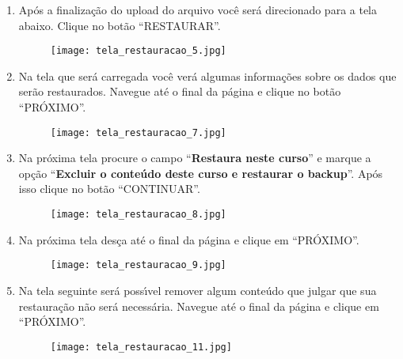 \documentclass[12pt]{report}
\begin{document}
\begin{enumerate}[\bf 1)]
  	\newpage

	\item Ap\'os a finaliza\c{c}\~ao do upload do arquivo voc\^e ser\'a direcionado para a tela abaixo. Clique no bot\~ao ``RESTAURAR''.
	\begin{figure}[H]
    	\centering
    	\hspace*{-2.5cm}\texttt{[image: tela\_restauracao\_5.jpg]}
  	\end{figure}

	\newpage

	\item  Na tela que ser\'a carregada voc\^e ver\'a algumas informa\c{c}\~oes sobre os dados que ser\~ao restaurados. Navegue at\'e o final da p\'agina e clique no bot\~ao ``PR\'OXIMO''.
	\begin{figure}[H]
    	\centering
    	\hspace*{-2.5cm}\texttt{[image: tela\_restauracao\_7.jpg]}
  	\end{figure}

  	\newpage

	\item Na pr\'oxima tela procure o campo ``\textbf{Restaura neste curso}'' e marque a op\c{c}\~ao ``\textbf{Excluir o conte\'udo deste curso e restaurar o backup}''. Ap\'os isso clique no bot\~ao ``CONTINUAR''.
	\begin{figure}[H]
    	\centering
    	\hspace*{-2.5cm}\texttt{[image: tela\_restauracao\_8.jpg]}
  	\end{figure}

	\newpage

	\item Na pr\'oxima tela des\c{c}a at\'e o final da p\'agina e clique em ``PR\'OXIMO''.
	\begin{figure}[H]
    	\centering
    	\hspace*{-2.5cm}\texttt{[image: tela\_restauracao\_9.jpg]}
  	\end{figure}

  	\newpage

	\item Na tela seguinte ser\'a poss{\'\i}vel remover algum conte\'udo que julgar que sua restaura\c{c}\~ao n\~ao ser\'a necess\'aria. Navegue at\'e o final da p\'agina e clique em ``PR\'OXIMO''.
	\begin{figure}[H]
    	\centering
    	\hspace*{-2.5cm}\texttt{[image: tela\_restauracao\_11.jpg]}
  	\end{figure}


\end{enumerate}
\end{document}

